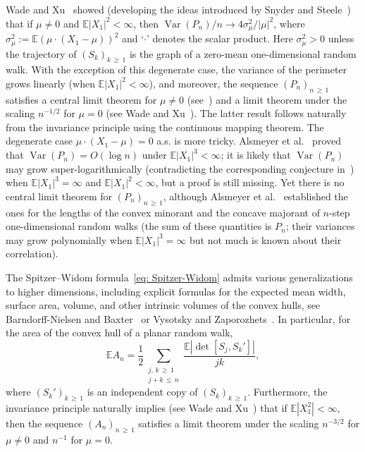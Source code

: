 \documentclass[10pt]{amsart}
\theoremstyle{definition}\newtheorem{defi}[theo]{Definition}\newtheorem{rema}[theo]{Remark}\newtheorem{exam}[theo]{Example}\newtheorem{exem}[theo]{Example}\newtheorem{nota}[theo]{Notation}
\newcommand{\E}{\mathbb{E}}
\newcommand{\Var}{\mathop{\mathrm{Var}}\nolimits}
\begin{document}
Wade and Xu~\cite{WadeXu} showed (developing the ideas introduced by Snyder and Steele~\cite{SnyderSteele}) that if $\mu \neq 0$ and $\E|X_1|^2<\infty$, then $\Var(P_n)/n \to 4 \sigma_\mu^2/|\mu|^2$, where $\sigma_\mu^2:=\E(\mu \cdot (X_1 - \mu))^2$ and `$\cdot$' denotes the scalar product. Here $\sigma_\mu^2>0$ unless the trajectory of $(S_k)_{k\,\ge\,1}$ is the graph of a zero-mean one-dimensional random walk. With the exception of this degenerate case, the variance of the perimeter grows linearly (when $\E|X_1|^2<\infty$), and moreover, the sequence $(P_n)_{n\,\ge\,1}$ satisfies a central limit theorem for $\mu \neq 0$ (see~\cite{WadeXu}) and a limit theorem under the scaling $n^{-1/2}$ for $\mu = 0$ (see Wade and Xu~\cite{WadeXu2}). The latter result follows naturally from the invariance principle using the continuous mapping theorem. The degenerate case $\mu \cdot (X_1 - \mu) =0$ a.s. is more tricky. Alsmeyer et al.~\cite{AKMV} proved that $\Var(P_n) =O(\log n)$ under $\E |X_1|^3<\infty$; it is likely that $\Var(P_n)$ may grow super-logarithmically (contradicting the corresponding conjecture in~\cite{WadeXu}) when $\E |X_1|^3=\infty$ and $\E |X_1|^2<\infty$, but a proof is still missing. Yet there is no central limit theorem for $(P_n)_{n\,\ge\,1}$, although Alsmeyer et al.~\cite{AKMV} established the ones for the lengths of the convex minorant and the concave majorant of $n$-step one-dimensional random walks (the sum of these quantities is $P_n$; their variances may grow polynomially when $\E |X_1|^3=\infty$ but not much is known about their correlation).

The Spitzer--Widom formula~\eqref{eq: Spitzer-Widom} admits various generalizations to higher dimensions, including explicit formulas for the expected mean width, surface area, volume, and other intrinsic volumes of the convex hulls, see Barndorff-Nielsen and Baxter~\cite{BNielsen} or Vysotsky and Zaporozhets~\cite{VysotskyZaporozhets}. In particular, for the area of the convex hull of a planar random walk,
\begin{equation}\label{eq: E area}
\E A_n = \frac12 \sum_{\substack{j,\,k\,\ge\,1 \\
j + k\,\le\,n }} \frac{\E|\det[S_j, S_k'] |}{jk},
\end{equation}
where $(S_k')_{k\,\ge\,1}$ is an independent copy of $(S_k)_{k\,\ge\,1}$. Furthermore, the invariance principle naturally implies (see Wade and Xu~\cite{WadeXu2}) that if $\E |X_1^2| <\infty$, then the sequence $(A_n)_{n\,\ge\,1}$ satisfies a limit theorem under the scaling $n^{-3/2}$ for $\mu \neq 0$ and $n^{-1}$ for $\mu=0$.
\end{document}
